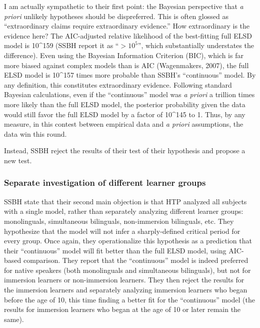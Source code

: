 \documentclass[
  english,
  doc,floatsintext]{apa6}
\begin{document}
I am actually sympathetic to their first point: the Bayesian perspective that \emph{a priori} unlikely hypotheses should be dispreferred. This is often glossed as ``extraordinary claims require extraordinary evidence.'' How extraordinary is the evidence here? The AIC-adjusted relative likelihood of the best-fitting full ELSD model is 10\^{}159 (SSBH report it as ``\(>10^5\)'', which substantially understates the difference). Even using the Bayesian Information Criterion (BIC), which is far more biased against complex models than is AIC (Wagenmakers, 2007), the full ELSD model is 10\^{}157 times more probable than SSBH's ``continuous'' model. By any definition, this constitutes extraordinary evidence. Following standard Bayesian calculations, even if the ``continuous'' model was \emph{a priori} a trillion times more likely than the full ELSD model, the posterior probability given the data would still favor the full ELSD model by a factor of 10\^{}145 to 1. Thus, by any measure, in this contest between empirical data and \emph{a priori} assumptions, the data win this round.

Instead, SSBH reject the results of their test of their hypothesis and propose a new test.

\hypertarget{separate-investigation-of-different-learner-groups}{%
\subsubsection{Separate investigation of different learner groups}\label{separate-investigation-of-different-learner-groups}}

SSBH state that their second main objection is that HTP analyzed all subjects with a single model, rather than separately analyzing different learner groups: monolinguals, simultaneous bilinguals, non-immersion bilinguals, etc. They hypothesize that the model will not infer a sharply-defined critical period for every group. Once again, they operationalize this hypothesis as a prediction that their ``continuous'' model will fit better than the full ELSD model, using AIC-based comparison. They report that the ``continuous'' model is indeed preferred for native speakers (both monolinguals and simultaneous bilinguals), but not for immersion learners or non-immersion learners. They then reject the results for the immersion learners and separately analyzing immersion learners who began before the age of 10, this time finding a better fit for the ``continuous'' model (the results for immersion learners who began at the age of 10 or later remain the same).
\end{document}

